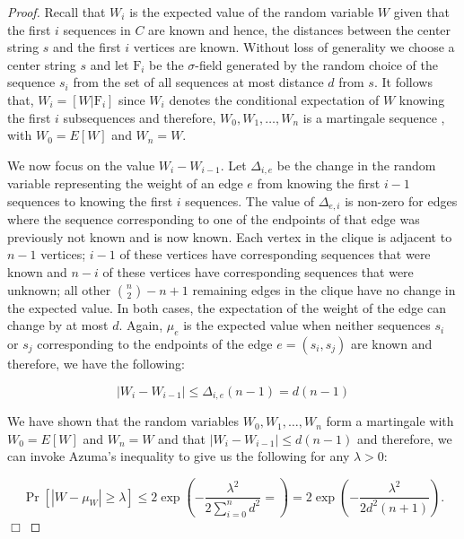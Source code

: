 \begin{proof} Recall that $W_i$ is the expected value of the random variable $W$ given that the first $i$ sequences in $C$ are known and hence, the distances between the center string $s$ and the first $i$ vertices are known. Without loss of generality we choose a center string $s$ and let $\mathrm{F}_i$ be the $\sigma$-field generated by the random choice of the sequence $s_i$ from the set of all sequences at most distance $d$ from $s$.  It follows that, $W_i = [W | \mathrm{F}_i]$ since $W_i$ denotes the conditional expectation of $W$ knowing the first $i$ subsequences and therefore, $W_0, W_1, \ldots, W_n$ is a martingale sequence \cite{MR95}, with $W_0 = E[W]$ and $W_n = W$.

We now focus on the value $W_i - W_{i - 1}$.  Let $\Delta_{i, e}$ be the change in the random variable representing the weight of an edge $e$ from knowing the first $i -1$ sequences to knowing the first $i$ sequences. The value of $\Delta_{e, i}$ is non-zero for edges where the sequence corresponding to one of the endpoints of that edge was previously not known and is now known.  Each vertex in the clique is adjacent to $n - 1$ vertices; $i - 1$ of these vertices have corresponding sequences that were known and $n - i$ of these vertices have corresponding sequences that were unknown; all other ${n \choose 2} - n + 1$ remaining edges in the clique have no change in the expected value. In both cases, the expectation of the weight of the edge can change by at most $d$. Again, $\mu_{e}$ is the expected value when neither sequences $s_i$ or $s_j$ corresponding to the endpoints of the edge $e = (s_i, s_j)$ are known and therefore, we have the following: 

\[ |W_{i} - W_{i - 1}| \leq \Delta_{i, e} (n - 1)  = d (n - 1) \]
 

\noindent We have shown that the random variables $W_0, W_1, \ldots, W_n$ form a martingale with $W_0 = E[W]$ and $W_n = W$ and that $|W_i - W_{i - 1}| \leq d(n - 1)$ and therefore, we can invoke Azuma's inequality \cite{MR95} to give us the following for any $\lambda  > 0$:

\[ \Pr\left[ |W - \mu_W| \geq \lambda \right]  \leq  2 \exp \left( - \frac{\lambda^2}{2 \sum_{i = 0}^n d^2} =  \right) =  2 \exp \left( - \frac{\lambda^2}{2d^2(n + 1)}  \right). \] \hfill $\Box$ \end{proof}

 
